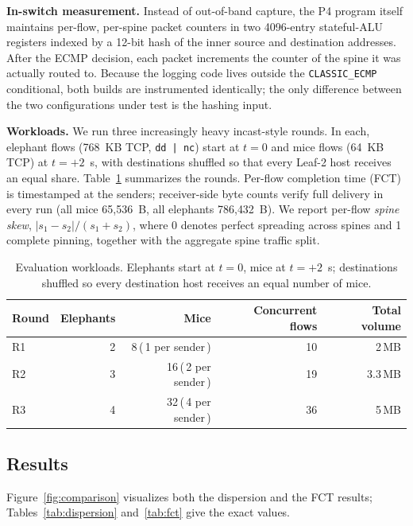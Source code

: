 \textbf{In-switch measurement.} Instead of out-of-band capture, the P4
program itself maintains per-flow, per-spine packet counters in two
4096-entry stateful-ALU registers indexed by a 12-bit hash of the inner
source and destination addresses. After the ECMP decision, each packet
increments the counter of the spine it was actually routed to. Because the
logging code lives outside the \texttt{CLASSIC\_ECMP} conditional, both
builds are instrumented identically; the only difference between the two
configurations under test is the hashing input.

\textbf{Workloads.} We run three increasingly heavy incast-style rounds.
In each, elephant flows (768~KB TCP, \texttt{dd~|~nc}) start at $t=0$ and
mice flows (64~KB TCP) at $t=+2$~s, with destinations shuffled so that
every Leaf-2 host receives an equal share. Table~\ref{tab:workloads}
summarizes the rounds. Per-flow completion time (FCT) is timestamped at
the senders; receiver-side byte counts verify full delivery in every run
(all mice 65{,}536~B, all elephants 786{,}432~B). We report per-flow
\emph{spine skew}, $|s_1 - s_2| / (s_1 + s_2)$, where 0 denotes perfect
spreading across spines and 1 complete pinning, together with the
aggregate spine traffic split.

\begin{table}[t]
  \centering
  \caption{Evaluation workloads. Elephants start at $t=0$, mice at $t=+2$~s; destinations shuffled so every destination host receives an equal number of mice.}
  \label{tab:workloads}
  \begin{tabular}{lrrrr}
    \toprule
    Round & Elephants & Mice & Concurrent flows & Total volume \\
    \midrule
    R1 & 2 & 8\,(\,1 per sender\,)  & 10 & 2\,MB \\
    R2 & 3 & 16\,(\,2 per sender\,) & 19 & 3.3\,MB \\
    R3 & 4 & 32\,(\,4 per sender\,) & 36 & 5\,MB \\
    \bottomrule
  \end{tabular}
\end{table}

\subsection{Results}
\label{sec:results}

Figure~\ref{fig:comparison} visualizes both the dispersion and the FCT
results; Tables~\ref{tab:dispersion} and~\ref{tab:fct} give the exact
values.


